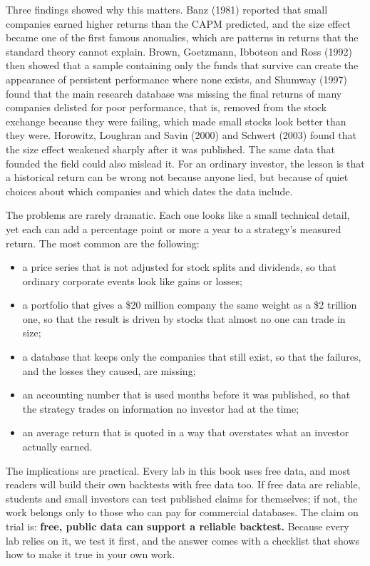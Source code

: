 Three findings showed why this matters. Banz (1981) reported that small companies earned higher returns than the CAPM predicted, and the size effect became one of the first famous anomalies, which are patterns in returns that the standard theory cannot explain. Brown, Goetzmann, Ibbotson and Ross (1992) then showed that a sample containing only the funds that survive can create the appearance of persistent performance where none exists, and Shumway (1997) found that the main research database was missing the final returns of many companies delisted for poor performance, that is, removed from the stock exchange because they were failing, which made small stocks look better than they were. Horowitz, Loughran and Savin (2000) and Schwert (2003) found that the size effect weakened sharply after it was published. The same data that founded the field could also mislead it. For an ordinary investor, the lesson is that a historical return can be wrong not because anyone lied, but because of quiet choices about which companies and which dates the data include.

The problems are rarely dramatic. Each one looks like a small technical detail, yet each can add a percentage point or more a year to a strategy's measured return. The most common are the following:

\begin{itemize}
  \item a price series that is not adjusted for stock splits and dividends, so that ordinary corporate events look like gains or losses;
  \item a portfolio that gives a \$20 million company the same weight as a \$2 trillion one, so that the result is driven by stocks that almost no one can trade in size;
  \item a database that keeps only the companies that still exist, so that the failures, and the losses they caused, are missing;
  \item an accounting number that is used months before it was published, so that the strategy trades on information no investor had at the time;
  \item an average return that is quoted in a way that overstates what an investor actually earned.
\end{itemize}

The implications are practical. Every lab in this book uses free data, and most readers will build their own backtests with free data too. If free data are reliable, students and small investors can test published claims for themselves; if not, the work belongs only to those who can pay for commercial databases. The claim on trial is: \textbf{free, public data can support a reliable backtest.} Because every lab relies on it, we test it first, and the answer comes with a checklist that shows how to make it true in your own work.

